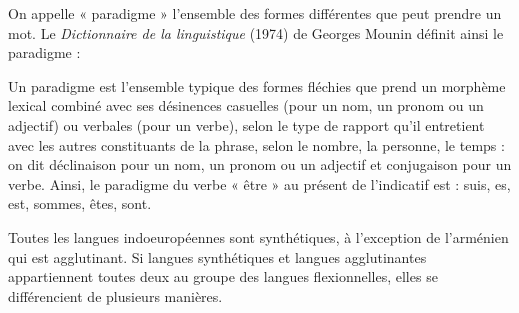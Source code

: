 On appelle « paradigme » l’ensemble des formes différentes que peut prendre un mot. Le \textit{Dictionnaire de la linguistique} (1974) de Georges Mounin définit ainsi le paradigme :

\begin{lecture}{}
Un paradigme est l’ensemble typique des formes fléchies que prend un morphème lexical combiné avec ses désinences casuelles (pour un nom, un pronom ou un adjectif) ou verbales (pour un verbe), selon le type de rapport qu’il entretient avec les autres constituants de la phrase, selon le nombre, la personne, le temps : on dit déclinaison pour un nom, un pronom ou un adjectif et conjugaison pour un verbe. Ainsi, le paradigme du verbe « être » au présent de l’indicatif est : suis, es, est, sommes, êtes, sont.
\end{lecture}

Toutes les langues indoeuropéennes sont synthétiques, à l’exception de l’arménien qui est agglutinant. Si langues synthétiques et langues agglutinantes appartiennent toutes deux au groupe des langues flexionnelles, elles se différencient de plusieurs manières.

